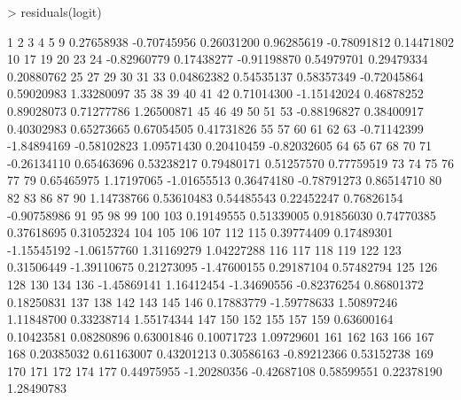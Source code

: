 \documentclass{article}
\begin{document}
\begin{Schunk}
\begin{Sinput}
> residuals(logit)
\end{Sinput}
\begin{Soutput}
          1           2           3           4           5           9 
 0.27658938 -0.70745956  0.26031200  0.96285619 -0.78091812  0.14471802 
         10          17          19          20          23          24 
-0.82960779  0.17438277 -0.91198870  0.54979701  0.29479334  0.20880762 
         25          27          29          30          31          33 
 0.04862382  0.54535137  0.58357349 -0.72045864  0.59020983  1.33280097 
         35          38          39          40          41          42 
 0.71014300 -1.15142024  0.46878252  0.89028073  0.71277786  1.26500871 
         45          46          49          50          51          53 
-0.88196827  0.38400917  0.40302983  0.65273665  0.67054505  0.41731826 
         55          57          60          61          62          63 
-0.71142399 -1.84894169 -0.58102823  1.09571430  0.20410459 -0.82032605 
         64          65          67          68          70          71 
-0.26134110  0.65463696  0.53238217  0.79480171  0.51257570  0.77759519 
         73          74          75          76          77          79 
 0.65465975  1.17197065 -1.01655513  0.36474180 -0.78791273  0.86514710 
         80          82          83          86          87          90 
 1.14738766  0.53610483  0.54485543  0.22452247  0.76826154 -0.90758986 
         91          95          98          99         100         103 
 0.19149555  0.51339005  0.91856030  0.74770385  0.37618695  0.31052324 
        104         105         106         107         112         115 
 0.39774409  0.17489301 -1.15545192 -1.06157760  1.31169279  1.04227288 
        116         117         118         119         122         123 
 0.31506449 -1.39110675  0.21273095 -1.47600155  0.29187104  0.57482794 
        125         126         128         130         134         136 
-1.45869141  1.16412454 -1.34690556 -0.82376254  0.86801372  0.18250831 
        137         138         142         143         145         146 
 0.17883779 -1.59778633  1.50897246  1.11848700  0.33238714  1.55174344 
        147         150         152         155         157         159 
 0.63600164  0.10423581  0.08280896  0.63001846  0.10071723  1.09729601 
        161         162         163         166         167         168 
 0.20385032  0.61163007  0.43201213  0.30586163 -0.89212366  0.53152738 
        169         170         171         172         174         177 
 0.44975955 -1.20280356 -0.42687108  0.58599551  0.22378190  1.28490783 

\end{Soutput}
\end{Schunk}
\end{document}
